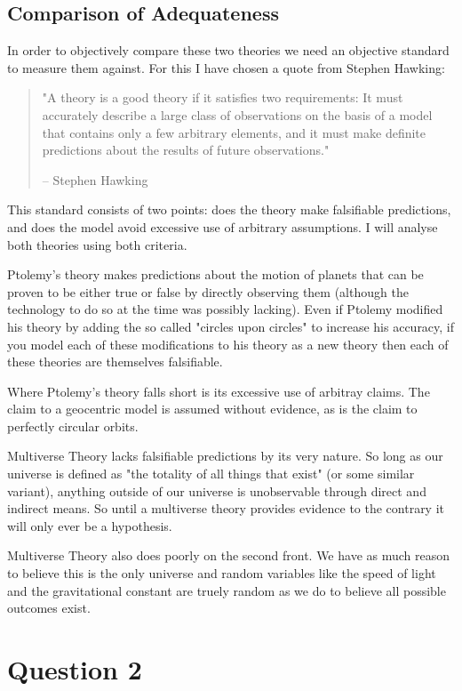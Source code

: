\documentclass[10pt,a4paper]{article}
\begin{document}
\subsection*{Comparison of Adequateness}
In order to objectively compare these two theories we need an objective standard to measure them against. For this I have chosen a quote from Stephen Hawking:

\begin{quote}
	"A theory is a good theory if it satisfies two requirements: It must accurately describe a large class of observations on the basis of a model that contains only a few arbitrary elements, and it must make definite predictions about the results of future observations."

	-- Stephen Hawking
\end{quote}

This standard consists of two points: does the theory make falsifiable predictions, and does the model avoid excessive use of arbitrary assumptions. I will analyse both theories using both criteria.

Ptolemy's theory makes predictions about the motion of planets that can be proven to be either true or false by directly observing them (although the technology to do so at the time was possibly lacking). Even if Ptolemy modified his theory by adding the so called "circles upon circles" to increase his accuracy, if you model each of these modifications to his theory as a new theory then each of these theories are themselves falsifiable.

Where Ptolemy's theory falls short is its excessive use of arbitray claims. The claim to a geocentric model is assumed without evidence, as is the claim to perfectly circular orbits.

Multiverse Theory lacks falsifiable predictions by its very nature. So long as our universe is defined as "the totality of all things that exist" (or some similar variant), anything outside of our universe is unobservable through direct and indirect means. So until a multiverse theory provides evidence to the contrary it will only ever be a hypothesis.

Multiverse Theory also does poorly on the second front. We have as much reason to believe this is the only universe and random variables like the speed of light and the gravitational constant are truely random as we do to believe all possible outcomes exist.

\section*{Question 2}
\end{document}
